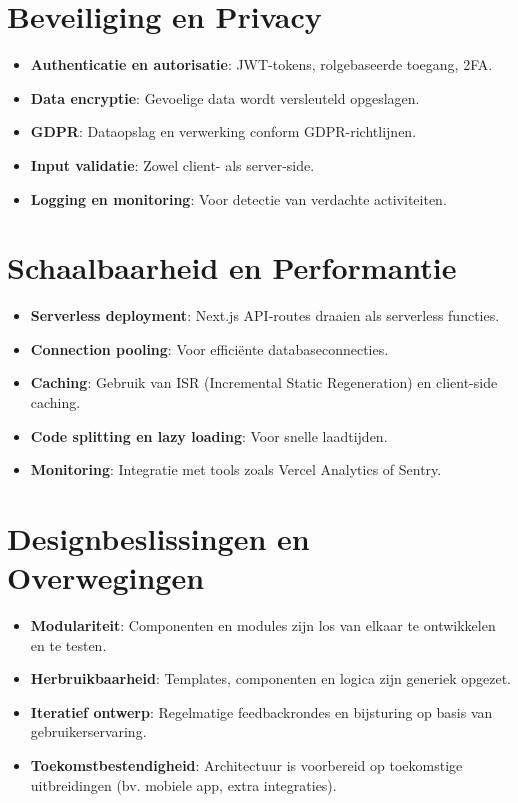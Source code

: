 \section{Beveiliging en Privacy}
\label{sec:security}

\begin{itemize}
    \item \textbf{Authenticatie en autorisatie}: JWT-tokens, rolgebaseerde toegang, 2FA.
    \item \textbf{Data encryptie}: Gevoelige data wordt versleuteld opgeslagen.
    \item \textbf{GDPR}: Dataopslag en verwerking conform GDPR-richtlijnen.
    \item \textbf{Input validatie}: Zowel client- als server-side.
    \item \textbf{Logging en monitoring}: Voor detectie van verdachte activiteiten.
   
\end{itemize}

\section{Schaalbaarheid en Performantie}
\label{sec:schaalbaarheid}

\begin{itemize}
    \item \textbf{Serverless deployment}: Next.js API-routes draaien als serverless functies.
    \item \textbf{Connection pooling}: Voor efficiënte databaseconnecties.
    \item \textbf{Caching}: Gebruik van ISR (Incremental Static Regeneration) en client-side caching.
    \item \textbf{Code splitting en lazy loading}: Voor snelle laadtijden.
    \item \textbf{Monitoring}: Integratie met tools zoals Vercel Analytics of Sentry.
\end{itemize}

\section{Designbeslissingen en Overwegingen}
\label{sec:design-keuzes}

\begin{itemize}
    \item \textbf{Modulariteit}: Componenten en modules zijn los van elkaar te ontwikkelen en te testen.
    \item \textbf{Herbruikbaarheid}: Templates, componenten en logica zijn generiek opgezet.
    \item \textbf{Iteratief ontwerp}: Regelmatige feedbackrondes en bijsturing op basis van gebruikerservaring.
    \item \textbf{Toekomstbestendigheid}: Architectuur is voorbereid op toekomstige uitbreidingen (bv. mobiele app, extra integraties).
\end{itemize}

